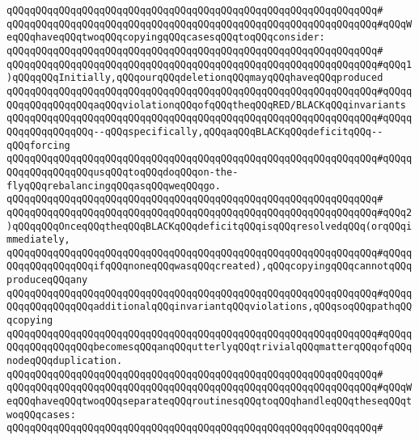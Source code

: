 \verb|qQQqqQQqqQQqqQQqqQQqqQQqqQQqqQQqqQQqqQQqqQQqqQQqqQQqqQQqqQQqqQQq#|\newline
\verb|qQQqqQQqqQQqqQQqqQQqqQQqqQQqqQQqqQQqqQQqqQQqqQQqqQQqqQQqqQQqqQQq#qQQqWeqQQqhaveqQQqtwoqQQqcopyingqQQqcasesqQQqtoqQQqconsider:|\newline
\verb|qQQqqQQqqQQqqQQqqQQqqQQqqQQqqQQqqQQqqQQqqQQqqQQqqQQqqQQqqQQqqQQq#|\newline
\verb|qQQqqQQqqQQqqQQqqQQqqQQqqQQqqQQqqQQqqQQqqQQqqQQqqQQqqQQqqQQqqQQq#qQQq1)qQQqqQQqInitially,qQQqourqQQqdeletionqQQqmayqQQqhaveqQQqproduced|\newline
\verb|qQQqqQQqqQQqqQQqqQQqqQQqqQQqqQQqqQQqqQQqqQQqqQQqqQQqqQQqqQQqqQQq#qQQqqQQqqQQqqQQqqQQqaqQQqviolationqQQqofqQQqtheqQQqRED/BLACKqQQqinvariants|\newline
\verb|qQQqqQQqqQQqqQQqqQQqqQQqqQQqqQQqqQQqqQQqqQQqqQQqqQQqqQQqqQQqqQQq#qQQqqQQqqQQqqQQqqQQq--qQQqspecifically,qQQqaqQQqBLACKqQQqdeficitqQQq--qQQqforcing|\newline
\verb|qQQqqQQqqQQqqQQqqQQqqQQqqQQqqQQqqQQqqQQqqQQqqQQqqQQqqQQqqQQqqQQq#qQQqqQQqqQQqqQQqqQQqusqQQqtoqQQqdoqQQqon-the-flyqQQqrebalancingqQQqasqQQqweqQQqgo.|\newline
\verb|qQQqqQQqqQQqqQQqqQQqqQQqqQQqqQQqqQQqqQQqqQQqqQQqqQQqqQQqqQQqqQQq#|\newline
\verb|qQQqqQQqqQQqqQQqqQQqqQQqqQQqqQQqqQQqqQQqqQQqqQQqqQQqqQQqqQQqqQQq#qQQq2)qQQqqQQqOnceqQQqtheqQQqBLACKqQQqdeficitqQQqisqQQqresolvedqQQq(orqQQqimmediately,|\newline
\verb|qQQqqQQqqQQqqQQqqQQqqQQqqQQqqQQqqQQqqQQqqQQqqQQqqQQqqQQqqQQqqQQq#qQQqqQQqqQQqqQQqqQQqifqQQqnoneqQQqwasqQQqcreated),qQQqcopyingqQQqcannotqQQqproduceqQQqany|\newline
\verb|qQQqqQQqqQQqqQQqqQQqqQQqqQQqqQQqqQQqqQQqqQQqqQQqqQQqqQQqqQQqqQQq#qQQqqQQqqQQqqQQqqQQqadditionalqQQqinvariantqQQqviolations,qQQqsoqQQqpathqQQqcopying|\newline
\verb|qQQqqQQqqQQqqQQqqQQqqQQqqQQqqQQqqQQqqQQqqQQqqQQqqQQqqQQqqQQqqQQq#qQQqqQQqqQQqqQQqqQQqbecomesqQQqanqQQqutterlyqQQqtrivialqQQqmatterqQQqofqQQqnodeqQQqduplication.|\newline
\verb|qQQqqQQqqQQqqQQqqQQqqQQqqQQqqQQqqQQqqQQqqQQqqQQqqQQqqQQqqQQqqQQq#|\newline
\verb|qQQqqQQqqQQqqQQqqQQqqQQqqQQqqQQqqQQqqQQqqQQqqQQqqQQqqQQqqQQqqQQq#qQQqWeqQQqhaveqQQqtwoqQQqseparateqQQqroutinesqQQqtoqQQqhandleqQQqtheseqQQqtwoqQQqcases:|\newline
\verb|qQQqqQQqqQQqqQQqqQQqqQQqqQQqqQQqqQQqqQQqqQQqqQQqqQQqqQQqqQQqqQQq#|\newline
